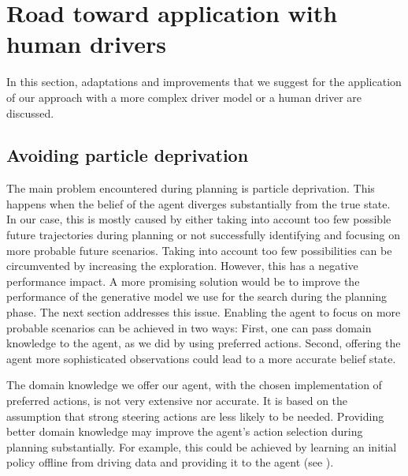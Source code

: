 






\section{Road toward application with human drivers}
\label{sec:future}

In this section, adaptations and improvements that we suggest for the application of our approach with a more complex driver model or a human driver are discussed. 

\subsection{Avoiding particle deprivation}

The main problem encountered during planning is particle deprivation. This happens when the belief of the agent diverges substantially from the true state. In our case, this is mostly caused by either taking into account too few possible future trajectories during planning or not successfully identifying and focusing on more probable future scenarios. Taking into account too few possibilities can be circumvented by increasing the exploration. However, this has a negative performance impact. A more promising solution would be to improve the performance of the generative model we use for the search during the planning phase. The next section addresses this issue. Enabling the agent to focus on more probable scenarios can be achieved in two ways: First, one can pass domain knowledge to the agent, as we did by using preferred actions. Second, offering the agent more sophisticated observations could lead to a more accurate belief state.

The domain knowledge we offer our agent, with the chosen implementation of preferred actions, is not very extensive nor accurate. It is based on the assumption that strong steering actions are less likely to be needed. Providing better domain knowledge may improve the agent's action selection during planning substantially. For example, this could be achieved by learning an initial policy offline from driving data and providing it to the agent (see \cite{combining_on_offline}).  

